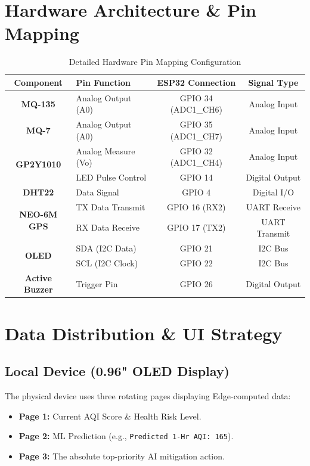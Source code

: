 \documentclass[12pt,a4paper]{report}
\begin{document}
\chapter{Hardware Architecture \& Pin Mapping}
\begin{table}[H]
    \centering
    \begin{tabularx}{\textwidth}{|c|X|c|c|}
        \hline
        \textbf{Component} & \textbf{Pin Function} & \textbf{ESP32 Connection} & \textbf{Signal Type} \\ \hline
        \textbf{MQ-135} & Analog Output (A0) & GPIO 34 (ADC1\_CH6) & Analog Input \\ \hline
        \textbf{MQ-7} & Analog Output (A0) & GPIO 35 (ADC1\_CH7) & Analog Input \\ \hline
        \multirow{2}{*}{\textbf{GP2Y1010}} & Analog Measure (Vo) & GPIO 32 (ADC1\_CH4) & Analog Input \\ \cline{2-4}
        & LED Pulse Control & GPIO 14 & Digital Output \\ \hline
        \textbf{DHT22} & Data Signal & GPIO 4 & Digital I/O \\ \hline
        \multirow{2}{*}{\textbf{NEO-6M GPS}} & TX Data Transmit & GPIO 16 (RX2) & UART Receive \\ \cline{2-4}
        & RX Data Receive & GPIO 17 (TX2) & UART Transmit \\ \hline
        \multirow{2}{*}{\textbf{OLED}} & SDA (I2C Data) & GPIO 21 & I2C Bus \\ \cline{2-4}
        & SCL (I2C Clock) & GPIO 22 & I2C Bus \\ \hline
        \textbf{Active Buzzer} & Trigger Pin & GPIO 26 & Digital Output \\ \hline
    \end{tabularx}
    \caption{Detailed Hardware Pin Mapping Configuration}
\end{table}

\chapter{Data Distribution \& UI Strategy}
\section{Local Device (0.96" OLED Display)}
The physical device uses three rotating pages displaying Edge-computed data:
\begin{itemize}
    \item \textbf{Page 1:} Current AQI Score \& Health Risk Level.
    \item \textbf{Page 2:} ML Prediction (e.g., \texttt{Predicted 1-Hr AQI: 165}).
    \item \textbf{Page 3:} The absolute top-priority AI mitigation action.
\end{itemize}
\end{document}

